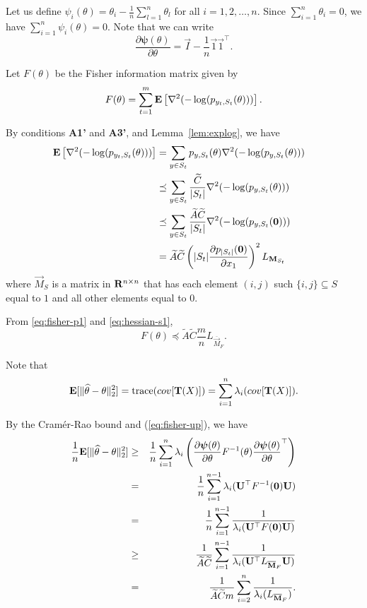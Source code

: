 Let us define $\psi_i(\theta) = \theta_i - \frac{1}{n}\sum_{l=1}^n\theta_l$ for all $i = 1,2,\ldots,n$. Since $\sum_{i=1}^n \theta_i =0$, we have $\sum_{i=1}^n \psi_i (\theta) = 0$. Note that we can write 
\begin{equation}
\frac{\partial \boldsymbol{\psi}(\theta)}{\partial \theta} = \vec{I} - \frac{1}{n}\vec{1}\vec{1}^\top.\label{eq:psi}
\end{equation} 

Let $F(\theta)$ be the Fisher information matrix given by
\begin{equation}
F(\theta) = \sum_{t=1}^m \mathbf{E}\left[\nabla^2(-\log(p_{y_t,S_t}(\theta))) \right] .\label{eq:fisher-p1}
\end{equation}

By conditions {\bf A1'} and {\bf A3'}, and Lemma~\ref{lem:explog}, we have
\begin{align}
\mathbf{E}\left[\nabla^2(-\log(p_{y_t,S_t}(\theta)))\right]
& =\sum_{y \in S_t} p_{y,S_t}(\theta) \nabla^2 (-\log(p_{y,S_t}(\theta))) \cr
& \preceq \sum_{y \in S_t} \frac{\widetilde{C}}{|S_t|} \nabla^2 (-\log(p_{y,S_t}(\theta)))\cr
& \preceq \sum_{y \in S_t} \frac{\widetilde{A}\widetilde{C}}{|S_t|} \nabla^2 (-\log(p_{y,S_t}({\bm 0})))\cr
& = \widetilde{A}\widetilde{C} \left(|S_t|\frac{\partial p_{|S_t|}(\mathbf{0})}{\partial x_1}\right)^2L_{\mathbf{M}_{S_t}}
\label{eq:hessian-s1}
\end{align}
where $\vec{M}_S$ is a matrix in $\mathbf{R}^{n\times n}$ that has each element $(i,j)$ such $\{i,j\}\subseteq S$ equal to $1$ and all other elements equal to $0$.

From \eqref{eq:fisher-p1} and \eqref{eq:hessian-s1},
\begin{equation}
F(\theta) \preceq  \widetilde{A}\widetilde{C} \frac{m}{n} L_{\overline{\vec{M}}_F}. 
\label{eq:fisher-up}
\end{equation}

Note that
$$
\mathbf{E}[\|\widehat{\theta}-\theta\|_2^2] = \mathrm{trace}(cov[\mathbf{T}(X)])
= \sum_{i=1}^n \lambda_i(cov[\mathbf{T}(X)]).
$$

By the Cram\'{e}r-Rao bound and (\ref{eq:fisher-up}), we have 
\begin{eqnarray*}
\frac{1}{n}\mathbf{E}[\|\widehat{\theta}-\theta\|_2^2]  
&\geq& \frac{1}{n}\sum_{i=1}^n \lambda_i \left(\frac{\partial \boldsymbol{\psi}(\theta)}{\partial \theta} F^{-1}(\theta) \frac{\partial \boldsymbol{\psi}(\theta)}{\partial \theta}^\top \right)\\
&=& \frac{1}{n}\sum_{i=1}^{n-1}  \lambda_i(\mathbf{U}^\top F^{-1}(\mathbf{0}) \mathbf{U})\\
&=& \frac{1}{n}\sum_{i=1}^{n-1}  \frac{1}{\lambda_i(\mathbf{U}^\top F(\mathbf{0}) \mathbf{U})}\\
& \geq &\frac{1}{\widetilde{A}\widetilde{C}} \sum_{i=1}^{n-1}  \frac{1}{\lambda_i(\mathbf{U}^\top L_{\overline{\mathbf{M}}_F} \mathbf{U})}\\
& = &\frac{1}{\widetilde{A}\widetilde{C} m} \sum_{i=2}^{n}  \frac{1}{\lambda_i(L_{\overline{\mathbf{M}}_F})}.
\end{eqnarray*}

